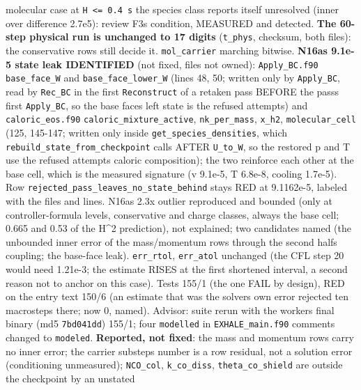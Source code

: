 \documentclass[english,a4paper]{my_memo}
\begin{document}
\begin{itemize}
  molecular case at \texttt{H\ \textless{}=\ 0.4\ s} the species class reports itself
  unresolved (inner over difference 2.7e5): review F3\textquotesingle s condition, MEASURED
  and detected. \textbf{The 60-step physical run is unchanged to 17 digits}
  (\texttt{t\_phys}, checksum, both files): the conservative rows still decide it.
  \texttt{mol\_carrier} marching bitwise. \textbf{N16a\textquotesingle s 9.1e-5 state leak IDENTIFIED}
  (not fixed, files not owned): \texttt{Apply\_BC.f90} \texttt{base\_face\_W} and
  \texttt{base\_face\_lower\_W} (lines 48, 50; written only by \texttt{Apply\_BC}, read by
  \texttt{Rec\_BC} in the first \texttt{Reconstruct} of a retaken pass BEFORE the pass\textquotesingle s
  first \texttt{Apply\_BC}, so the base face\textquotesingle s left state is the refused
  attempt\textquotesingle s) and \texttt{caloric\_eos.f90} \texttt{caloric\_mixture\_active}, \texttt{nk\_per\_mass},
  \texttt{x\_h2}, \texttt{molecular\_cell} (125, 145-147; written only inside
  \texttt{get\_species\_densities}, which \texttt{rebuild\_state\_from\_checkpoint} calls
  AFTER \texttt{U\_to\_W}, so the restored p and T use the refused attempt\textquotesingle s caloric
  composition); the two reinforce each other at the base cell, which is
  the measured signature (v 9.1e-5, T 6.8e-8, cooling 1.7e-5). Row
  \texttt{rejected\_pass\_leaves\_no\_state\_behind} stays RED at 9.1162e-5, labeled
  with the files and lines. N16a\textquotesingle s 2.3x outlier reproduced and bounded (only
  at controller-formula levels, conservative and charge classes, always the
  base cell; 0.665 and 0.53 of the H\^{}2 prediction), not explained; two
  candidates named (the unbounded inner error of the mass/momentum rows
  through the second half\textquotesingle s coupling; the base-face leak). \texttt{err\_rtol},
  \texttt{err\_atol} unchanged (the CFL step 20 would need 1.21e-3; the estimate
  RISES at the first shortened interval, a second reason not to anchor on
  this case). Tests 155/1 (the one FAIL by design), RED on the entry text
  150/6 (an estimate that was the solvers\textquotesingle{} own error rejected ten
  macrosteps there; now 0, named). Advisor: suite rerun with the worker\textquotesingle s
  final binary (md5 \texttt{7bd041dd}) 155/1; four \texttt{modelled} in \texttt{EXHALE\_main.f90}
  comments changed to \texttt{modeled}. \textbf{Reported, not fixed}: the mass and
  momentum rows carry no inner error; the carrier substep\textquotesingle s number is a row
  residual, not a solution error (conditioning unmeasured); \texttt{NCO\_col},
  \texttt{k\_co\_diss}, \texttt{theta\_co\_shield} are outside the checkpoint by an unstated

\end{itemize}
\end{document}
